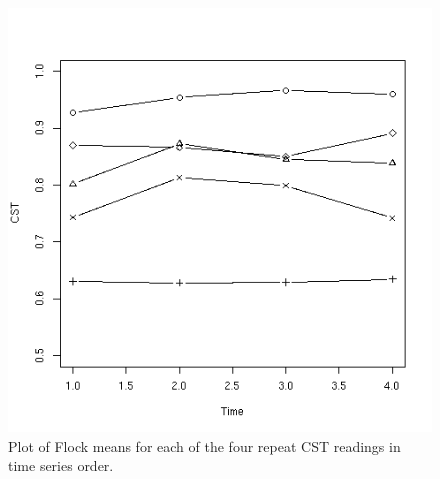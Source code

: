 %

\begin{figure}[!h]
  \centering
  \includegraphics[width=1.0\textwidth]{cst.png}
  \caption{Plot of Flock means for each of the four repeat CST readings in time series order.}
  \label{fig:cst}
\end{figure}

%

